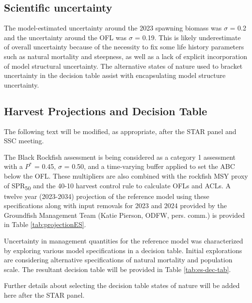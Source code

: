 \documentclass[11pt,
  english,
  letterpaper,
]{article}
\begin{document}
\hypertarget{scientific-uncertainty}{%
\subsection*{Scientific uncertainty}\label{scientific-uncertainty}}

The model-estimated uncertainty around the 2023 spawning biomass was \(\sigma\) = 0.2 and the uncertainty around the OFL was \(\sigma\) = 0.19. This is likely underestimate of overall uncertainty because of the necessity to fix some life history parameters such as natural mortality and steepness, as well as a lack of explicit incorporation of model structural uncertainty. The alternative states of nature used to bracket uncertainty in the decision table assist with encapsulating model structure uncertainty.

\hypertarget{harvest-projections-and-decision-table}{%
\subsection*{Harvest Projections and Decision Table}\label{harvest-projections-and-decision-table}}

The following text will be modified, as appropriate, after the STAR panel and SSC meeting.

The Black Rockfish assessment is being considered as a category 1 assessment with a \(P^*\) = 0.45, \(\sigma\) = 0.50, and a time-varying buffer applied to set the ABC below the OFL. These multipliers are also combined with the rockfish MSY proxy of SPR\textsubscript{50} and the 40-10 harvest control rule to calculate OFLs and ACLs. A twelve year (2023-2034) projection of the reference model using these specifications along with input removals for 2023 and 2024 provided by the Groundfish Management Team (Katie Pierson, ODFW, pers. comm.) is provided in Table \ref{tab:projectionES}.



Uncertainty in management quantities for the reference model was characterized by exploring various model specifications in a decision table. Initial explorations are considering alternative specifications of natural mortality and population scale. The resultant decision table will be provided in Table \ref{tab:es-dec-tab}.

Further details about selecting the decision table states of nature will be added here after the STAR panel.
\end{document}

